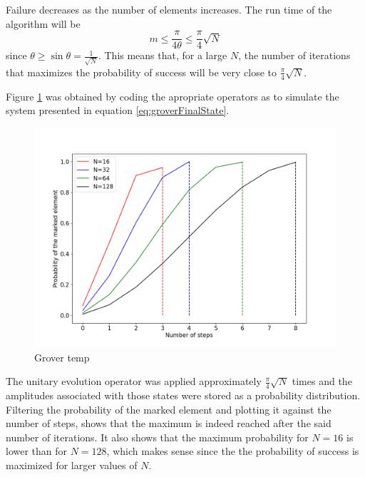 \documentclass[../../dissertation.tex]{subfiles}
\begin{document}
Failure decreases as the number of elements increases. The run time of the algorithm will be
\begin{equation}
	m \leq \frac{\pi}{4\theta} \leq \frac{\pi}{4}\sqrt{N}
\end{equation}
since $\theta \geq \sin\theta = \frac{1}{\sqrt{N}}$. This means that, for a large $N$, the number of iterations that maximizes the probability of success will be very close to $\frac{\pi}{4}\sqrt{N}$.\par
Figure \ref{fig:groverOneMarked163264128} was obtained by coding the apropriate operators as to simulate the system presented in equation \ref{eq:groverFinalState}. 
\begin{figure}[!h]
	\centering
	\includegraphics[scale=0.40]{img/Grover/GroverOneMarked163264128}
	\caption{Grover temp} 
	\label{fig:groverOneMarked163264128}
\end{figure}
The unitary evolution operator was applied approximately $\frac{\pi}{4}\sqrt{N}$ times and the amplitudes associated with those states were stored as a probability distribution. Filtering the probability of the marked element and plotting it against the number of steps, shows that the maximum is indeed reached after the said number of iterations. It also shows that the maximum probability for $N=16$ is lower than for $N=128$, which makes sense since the the probability of success is maximized for larger values of $N$.
\end{document}
